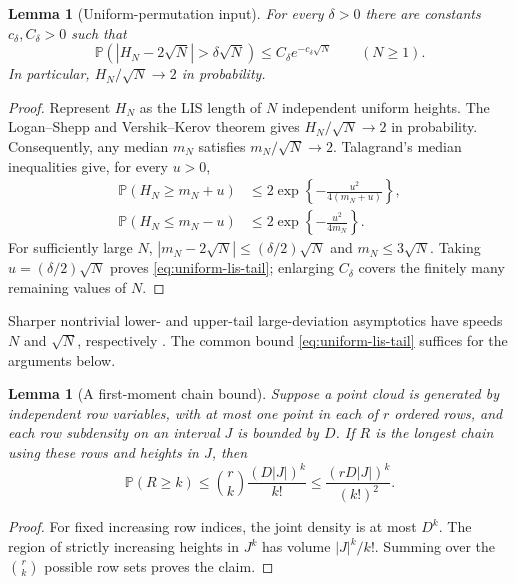 \documentclass[11pt]{article}
\newtheorem{lemma}[theorem]{Lemma}
\theoremstyle{remark}
\newcommand{\Pp}{\mathbb P}
\begin{document}
\begin{lemma}[Uniform-permutation input]\label{lem:uniform-lis}
For every $\delta>0$ there are constants $c_\delta,C_\delta>0$ such that
\begin{equation}\label{eq:uniform-lis-tail}
 \Pp\left(|H_N-2\sqrt N|>\delta\sqrt N\right)
 \le C_\delta e^{-c_\delta\sqrt N}
 \qquad(N\ge1).
\end{equation}
In particular, $H_N/\sqrt N\to2$ in probability.
\end{lemma}

\begin{proof}
Represent $H_N$ as the LIS length of $N$ independent uniform heights.
The Logan--Shepp and Vershik--Kerov theorem
\cite{LoganShepp1977,VershikKerov1977} gives $H_N/\sqrt N\to2$ in
probability.  Consequently, any median $m_N$ satisfies $m_N/\sqrt N\to2$.
Talagrand's median inequalities \cite[Theorem~7.1.2]{Talagrand1995} give,
for every $u>0$,
\begin{align*}
 \Pp(H_N\ge m_N+u)
 &\le2\exp\left\{-\frac{u^2}{4(m_N+u)}\right\},\\
 \Pp(H_N\le m_N-u)
 &\le2\exp\left\{-\frac{u^2}{4m_N}\right\}.
\end{align*}
For sufficiently large $N$,
$|m_N-2\sqrt N|\le(\delta/2)\sqrt N$ and $m_N\le3\sqrt N$.
Taking $u=(\delta/2)\sqrt N$ proves
\eqref{eq:uniform-lis-tail}; enlarging $C_\delta$ covers the finitely many
remaining values of $N$.
\end{proof}

Sharper nontrivial lower- and upper-tail large-deviation asymptotics have
speeds $N$ and $\sqrt N$, respectively
\cite{DeuschelZeitouni1999}.  The common bound
\eqref{eq:uniform-lis-tail} suffices for the arguments below.

\begin{lemma}[A first-moment chain bound]\label{lem:first-moment-chain}
Suppose a point cloud is generated by independent row variables, with at most
one point in each of $r$ ordered rows, and each row subdensity on an interval
$J$ is bounded by $D$.  If $R$ is the
longest chain using these rows and heights in $J$, then
\begin{equation}\label{eq:first-moment-chain}
        \Pp(R\ge k)
        \le \binom rk\frac{(D|J|)^k}{k!}
        \le\frac{(rD|J|)^k}{(k!)^2}.
\end{equation}
\end{lemma}

\begin{proof}
For fixed increasing row indices, the joint density is at most $D^k$.
The region of strictly increasing heights in $J^k$ has volume $|J|^k/k!$.
Summing over the $\binom rk$ possible row sets proves the claim.
\end{proof}
\end{document}
